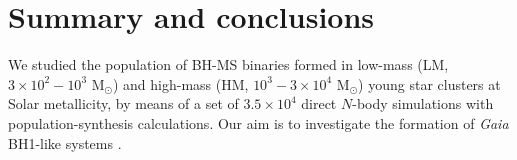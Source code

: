 \documentclass[fleqn,usenatbib]{mnras}
\newcommand{\Ms}{M$_\odot$}
\newcommand{\bh}{\textit{Gaia} BH1}
\newcommand{\SR}[1]{\textcolor{red}{#1}}
\begin{document}








\section{Summary and conclusions}
\label{sec:conclusions}
We studied the population of BH-MS binaries formed in low-mass (LM, $3\times10^2-10^3$ M$_\odot$) and high-mass (HM, $10^3-3\times{}10^4$ M$_\odot$) young star clusters at Solar metallicity, by means of a set of $3.5\times{}10^4$ direct $N$-body simulations with population-synthesis calculations. Our aim is to investigate the formation of \bh{}-like systems \citep{elbadry2023a}. 
\end{document}
